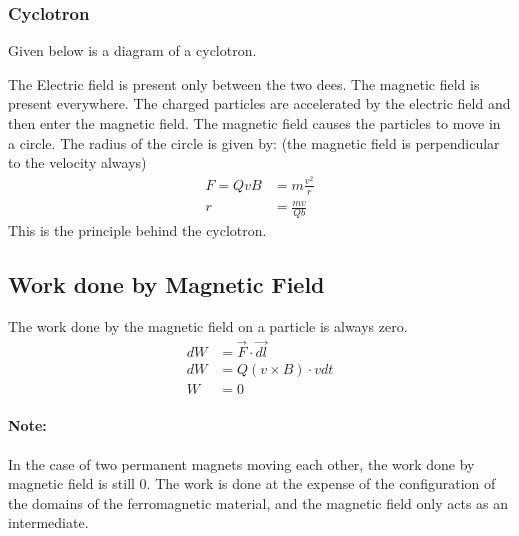 \documentclass{article}
\begin{document}
\subsubsection*{Cyclotron}
Given below is a diagram of a cyclotron.\\
\begin{figure}[h]
{}
\end{figure}
The Electric field is present only between the two dees. 
The magnetic field is present everywhere. 
The charged particles are accelerated by the electric field and then enter the magnetic field. 
The magnetic field causes the particles to move in a circle. 
The radius of the circle is given by: (the magnetic field is perpendicular to the velocity always)
\begin{align*}
    F = QvB &= m\frac{v^2}{r}\\
    r &= \frac{mv}{Qb}
\end{align*}
This is the principle behind the cyclotron.

\subsection{Work done by Magnetic Field}
The work done by the magnetic field on a particle is always zero.
\begin{align*}
    dW &= \vec{F} \cdot \vec{dl}\\
    dW &= Q(v \times B) \cdot vdt\\
    W &= 0
\end{align*}

\paragraph{Note: } In the case of two permanent magnets moving each other, the work done by magnetic field is still $0$.
The work is done at the expense of the configuration of the domains of the ferromagnetic material, and the magnetic field only acts as an intermediate.
\end{document}
